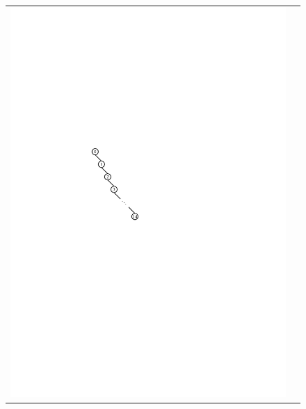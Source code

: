 \begin{figure}
  \begin{center}
    \begin{tabular}{cc}
      \includegraphics[scale=0.90909,scale=0.95]{figs/bst-path} &

\end{tabular}
\end{center}
\end{figure}
